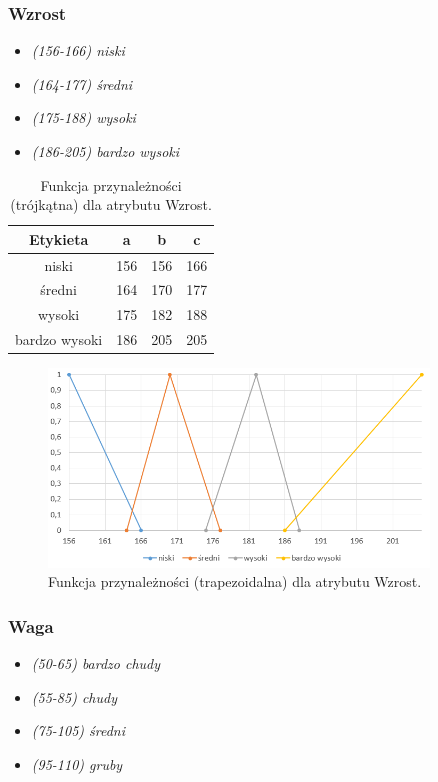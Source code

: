 \documentclass{classrep}
\begin{document}
	\newpage
	\subsubsection{Wzrost}
	\begin{itemize}
		\item \textsl{(156-166) niski}
		\item \textsl{(164-177) średni}
		\item \textsl{(175-188) wysoki}
		\item \textsl{(186-205) bardzo wysoki}
	\end{itemize}
	
	\begin{table}[h!]
		\centering
		\begin{tabular} {c c c c}
			\hline
			\textbf{Etykieta} & \textbf{a} & \textbf{b} & \textbf{c} \\ [0.5ex] 
			\hline	
			\hline 
			niski & 156 & 156 & 166 \\
			średni & 164 & 170 & 177 \\
			wysoki & 175 & 182 & 188 \\
			bardzo wysoki & 186 & 205 & 205  \\
			\hline
		\end{tabular}
		\caption{Funkcja przynależności (trójkątna) dla atrybutu Wzrost. }
		\label{tabelaWzrost}
	\end{table}
	
	\begin{figure}[h!]
		\centering
		\includegraphics[width=0.9\textwidth]{zmienne/2.png}
		\caption{Funkcja przynależności (trapezoidalna) dla atrybutu Wzrost.}
		\label{wykresWzrost}
	\end{figure}

	\newpage
	\subsubsection{Waga}
	\begin{itemize}
		\item \textsl{(50-65) bardzo chudy}
		\item \textsl{(55-85) chudy}
		\item \textsl{(75-105) średni}
		\item \textsl{(95-110) gruby}
	\end{itemize}
	
\end{document}

